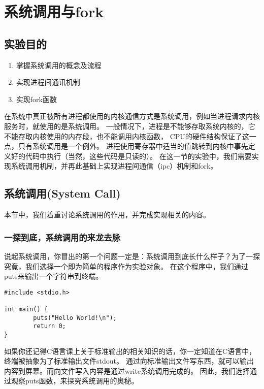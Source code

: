 \chapter{系统调用与fork}

\section{实验目的}
  \begin{enumerate}
    \item 掌握系统调用的概念及流程
    \item 实现进程间通讯机制
    \item 实现fork函数
  \end{enumerate}

在系统中真正被所有进程都使用的内核通信方式是系统调用，例如当进程请求内核服务时，就使用的是系统调用。
一般情况下，进程是不能够存取系统内核的，它不能存取内核使用的内存段，也不能调用内核函数，
CPU的硬件结构保证了这一点，只有系统调用是一个例外。
进程使用寄存器中适当的值跳转到内核中事先定义好的代码中执行（当然，这些代码是只读的）。
在这一节的实验中，我们需要实现系统调用机制，并再此基础上实现进程间通信（ipc）机制和fork。

\section{系统调用(System Call)}
本节中，我们着重讨论系统调用的作用，并完成实现相关的内容。

\subsection{一探到底，系统调用的来龙去脉}
说起系统调用，你冒出的第一个问题一定是：系统调用到底长什么样子？为了一探究竟，我们选择一个即为简单的程序作为实验对象。
在这个程序中，我们通过puts来输出一个字符串到终端。

\begin{verbatim}
#include <stdio.h>

int main() {
        puts("Hello World!\n");
        return 0;
}
\end{verbatim}

\begin{note}
如果你还记得C语言课上关于标准输出的相关知识的话，你一定知道在C语言中，终端被抽象为了标准输出文件stdout。
通过向标准输出文件写东西，就可以输出内容到屏幕。而向文件写入内容是通过write系统调用完成的。
因此，我们选择通过观察puts函数，来探究系统调用的奥秘。
\end{note}

